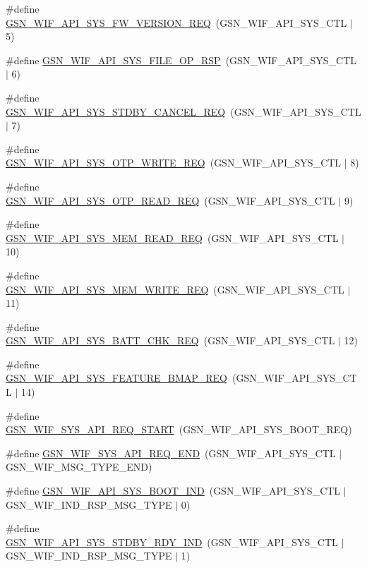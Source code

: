 \begin{DoxyCompactItemize}
\item 
\#define \hyperlink{a00606_a3dbcf8abb5c0ba6ed779472b6af453c0}{GSN\_\-WIF\_\-API\_\-SYS\_\-FW\_\-VERSION\_\-REQ}~(GSN\_\-WIF\_\-API\_\-SYS\_\-CTL $|$ 5)
\item 
\#define \hyperlink{a00606_a15ace3ae6990865d2940c7681642cac6}{GSN\_\-WIF\_\-API\_\-SYS\_\-FILE\_\-OP\_\-RSP}~(GSN\_\-WIF\_\-API\_\-SYS\_\-CTL $|$ 6)
\item 
\#define \hyperlink{a00606_ac2fcf63e15733f2b941ed0042282fa07}{GSN\_\-WIF\_\-API\_\-SYS\_\-STDBY\_\-CANCEL\_\-REQ}~(GSN\_\-WIF\_\-API\_\-SYS\_\-CTL $|$ 7)
\item 
\#define \hyperlink{a00606_a2f161fe998e2f4e9293bb9c555d0d6d4}{GSN\_\-WIF\_\-API\_\-SYS\_\-OTP\_\-WRITE\_\-REQ}~(GSN\_\-WIF\_\-API\_\-SYS\_\-CTL $|$ 8)
\item 
\#define \hyperlink{a00606_a9e43ea4cb7108ce9d5ff1eb0e3623f58}{GSN\_\-WIF\_\-API\_\-SYS\_\-OTP\_\-READ\_\-REQ}~(GSN\_\-WIF\_\-API\_\-SYS\_\-CTL $|$ 9)
\item 
\#define \hyperlink{a00606_a3f3fe0223e46a1f2d66ad838b535fb67}{GSN\_\-WIF\_\-API\_\-SYS\_\-MEM\_\-READ\_\-REQ}~(GSN\_\-WIF\_\-API\_\-SYS\_\-CTL $|$ 10)
\item 
\#define \hyperlink{a00606_a60e546c898b2b9fa3f373311b2edd6a0}{GSN\_\-WIF\_\-API\_\-SYS\_\-MEM\_\-WRITE\_\-REQ}~(GSN\_\-WIF\_\-API\_\-SYS\_\-CTL $|$ 11)
\item 
\#define \hyperlink{a00606_a7a2b143bb66de836a2b96e5fb0e35d88}{GSN\_\-WIF\_\-API\_\-SYS\_\-BATT\_\-CHK\_\-REQ}~(GSN\_\-WIF\_\-API\_\-SYS\_\-CTL $|$ 12)
\item 
\#define \hyperlink{a00606_a4535e602c9ce56975b1048ff27f961e2}{GSN\_\-WIF\_\-API\_\-SYS\_\-FEATURE\_\-BMAP\_\-REQ}~(GSN\_\-WIF\_\-API\_\-SYS\_\-CTL $|$ 14)
\item 
\#define \hyperlink{a00606_a0b7c07d125cb7a93691b3df400da4260}{GSN\_\-WIF\_\-SYS\_\-API\_\-REQ\_\-START}~(GSN\_\-WIF\_\-API\_\-SYS\_\-BOOT\_\-REQ)
\item 
\#define \hyperlink{a00606_ad4f159041961543262f326993fa41304}{GSN\_\-WIF\_\-SYS\_\-API\_\-REQ\_\-END}~(GSN\_\-WIF\_\-API\_\-SYS\_\-CTL $|$ GSN\_\-WIF\_\-MSG\_\-TYPE\_\-END)
\item 
\#define \hyperlink{a00606_afc607e4455b6d89c4b50f43cb98dc7df}{GSN\_\-WIF\_\-API\_\-SYS\_\-BOOT\_\-IND}~(GSN\_\-WIF\_\-API\_\-SYS\_\-CTL $|$ GSN\_\-WIF\_\-IND\_\-RSP\_\-MSG\_\-TYPE $|$ 0)
\item 
\#define \hyperlink{a00606_a345e36cd22f979d5658b2810ea85bdae}{GSN\_\-WIF\_\-API\_\-SYS\_\-STDBY\_\-RDY\_\-IND}~(GSN\_\-WIF\_\-API\_\-SYS\_\-CTL $|$ GSN\_\-WIF\_\-IND\_\-RSP\_\-MSG\_\-TYPE $|$ 1)

\end{DoxyCompactItemize}
